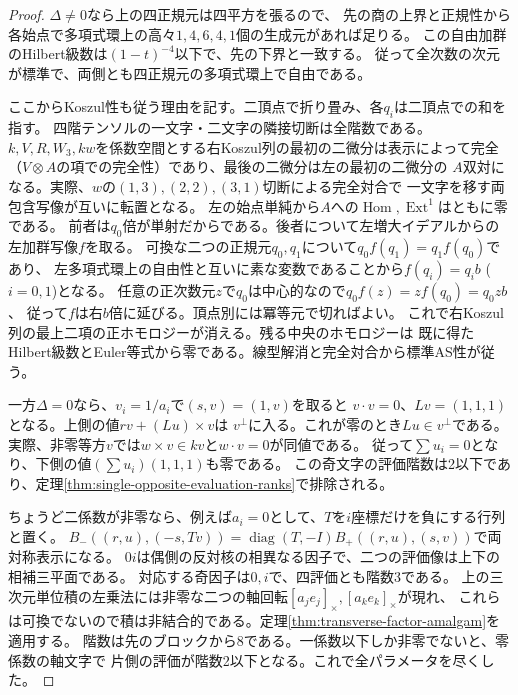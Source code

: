 \begin{proof}
$\Delta\ne0$なら上の四正規元は四平方を張るので、
先の商の上界と正規性から各始点で多項式環上の高々$1,4,6,4,1$個の生成元があれば足りる。
この自由加群のHilbert級数は$(1-t)^{-4}$以下で、先の下界と一致する。
従って全次数の次元が標準で、両側とも四正規元の多項式環上で自由である。

ここからKoszul性も従う理由を記す。二頂点で折り畳み、各$q_i$は二頂点での和を指す。
四階テンソルの一文字・二文字の隣接切断は全階数である。
$k,V,R,W_3,kw$を係数空間とする右Koszul列の最初の二微分は表示によって完全
（$V\otimes A$の項での完全性）であり、最後の二微分は左の最初の二微分の
$A$双対になる。実際、$w$の$(1,3),(2,2),(3,1)$切断による完全対合で
一文字を移す両包含写像が互いに転置となる。
左の始点単純から$A$への$\operatorname{Hom},\operatorname{Ext}^1$はともに零である。
前者は$q_0$倍が単射だからである。後者について左増大イデアルからの左加群写像$f$を取る。
可換な二つの正規元$q_0,q_1$について$q_0 f(q_1)=q_1 f(q_0)$であり、
左多項式環上の自由性と互いに素な変数であることから$f(q_i)=q_i b$ ($i=0,1$)となる。
任意の正次数元$z$で$q_0$は中心的なので$q_0f(z)=z f(q_0)=q_0zb$、
従って$f$は右$b$倍に延びる。頂点別には冪等元で切ればよい。
これで右Koszul列の最上二項の正ホモロジーが消える。残る中央のホモロジーは
既に得たHilbert級数とEuler等式から零である。線型解消と完全対合から標準AS性が従う。

一方$\Delta=0$なら、$v_i=1/a_i$で$(s,v)=(1,v)$を取ると
$v\cdot v=0$、$Lv=(1,1,1)$となる。上側の値$rv+(Lu)\times v$は
$v^\perp$に入る。これが零のとき$Lu\in v^\perp$である。
実際、非零等方$v$では$w\times v\in kv$と$w\cdot v=0$が同値である。
従って$\sum u_i=0$となり、下側の値$(\sum u_i)(1,1,1)$も零である。
この奇文字の評価階数は2以下であり、定理\ref{thm:single-opposite-evaluation-ranks}で排除される。

ちょうど二係数が非零なら、例えば$a_i=0$として、$T$を$i$座標だけを負にする行列と置く。
$B_-((r,u),(-s,Tv))=\operatorname{diag}(T,-I)B_+((r,u),(s,v))$で両対称表示になる。
$0i$は偶側の反対核の相異なる因子で、二つの評価像は上下の相補三平面である。
対応する奇因子は$0,i$で、四評価とも階数3である。
上の三次元単位積の左乗法には非零な二つの軸回転$[a_j e_j]_\times,[a_k e_k]_\times$が現れ、
これらは可換でないので積は非結合的である。定理\ref{thm:transverse-factor-amalgam}を適用する。
階数は先のブロックから8である。一係数以下しか非零でないと、零係数の軸文字で
片側の評価が階数2以下となる。これで全パラメータを尽くした。


\end{proof}
